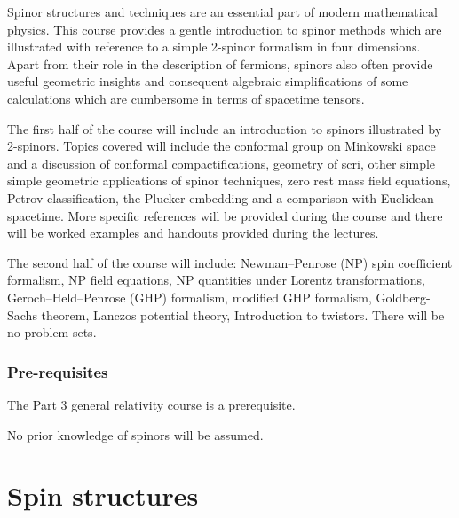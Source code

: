 \documentclass[a4paper]{article}
\begin{document}
\maketitle
{\small
\setlength{\parindent}{0em}
\setlength{\parskip}{1em}
Spinor structures and techniques are an essential part of modern mathematical physics. This course provides a gentle introduction to spinor methods which are illustrated with reference to a simple 2-spinor formalism in four dimensions. Apart from their role in the description of fermions, spinors also often provide useful geometric insights and consequent algebraic simplifications of some calculations which are cumbersome in terms of spacetime tensors.

The first half of the course will include an introduction to spinors illustrated by 2-spinors. Topics covered will include the conformal group on Minkowski space and a discussion of conformal compactifications, geometry of scri, other simple simple geometric applications of spinor techniques, zero rest mass field equations, Petrov classification, the Plucker embedding and a comparison with Euclidean spacetime. More specific references will be provided during the course and there will be worked examples and handouts provided during the lectures.

The second half of the course will include: Newman--Penrose (NP) spin coefficient formalism, NP field equations, NP quantities under Lorentz transformations, Geroch--Held--Penrose (GHP) formalism, modified GHP formalism, Goldberg-Sachs theorem, Lanczos potential theory, Introduction to twistors. There will be no problem sets.
\subsubsection*{Pre-requisites}
The Part 3 general relativity course is a prerequisite.

No prior knowledge of spinors will be assumed.
}
\tableofcontents

\section{Spin structures}
\end{document}
